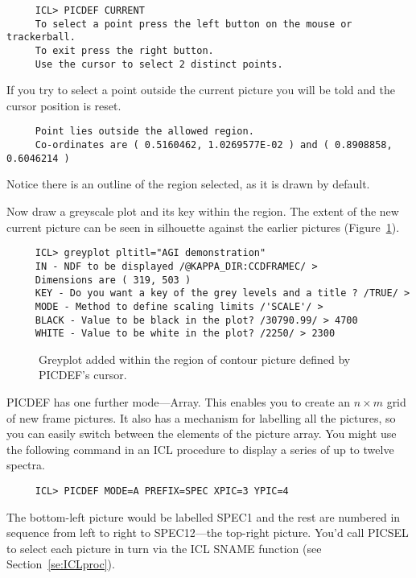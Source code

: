 {\small
\begin{verbatim}
     ICL> PICDEF CURRENT
     To select a point press the left button on the mouse or trackerball.
     To exit press the right button.
     Use the cursor to select 2 distinct points.
\end{verbatim}
\normalsize
If you try to select a point outside the current picture you will be told
and the cursor position is reset.

\small
\begin{verbatim}
     Point lies outside the allowed region.
     Co-ordinates are ( 0.5160462, 1.0269577E-02 ) and ( 0.8908858, 0.6046214 )
\end{verbatim}
\normalsize
Notice there is an outline of the region selected, as it is drawn
by default.

Now draw a greyscale plot and its key within the region.
The extent of the new current picture can be seen in silhouette against
the earlier pictures (Figure~\ref{fi:agi5}).

\small
\begin{verbatim}
     ICL> greyplot pltitl="AGI demonstration"
     IN - NDF to be displayed /@KAPPA_DIR:CCDFRAMEC/ >
     Dimensions are ( 319, 503 )
     KEY - Do you want a key of the grey levels and a title ? /TRUE/ >
     MODE - Method to define scaling limits /'SCALE'/ >
     BLACK - Value to be black in the plot? /30790.99/ > 4700
     WHITE - Value to be white in the plot? /2250/ > 2300
\end{verbatim}
\normalsize
\begin{figure}[ht]
\caption{Greyplot added within the region of contour picture defined by
PICDEF's cursor.}
\label{fi:agi5}
\vspace{4.4in}
\end{figure}
PICDEF has one further mode---Array.  This enables you to create an
$n\times m$ grid of new frame pictures.  It also has a mechanism for
labelling all the pictures, so you can easily switch between the
elements of the picture array.  You might use the following command in
an {\small ICL} procedure to display a series of up to twelve spectra.

\small
\begin{verbatim}
     ICL> PICDEF MODE=A PREFIX=SPEC XPIC=3 YPIC=4
\end{verbatim}
\normalsize
The bottom-left picture would be labelled SPEC1 and the rest are
numbered in sequence from left to right to SPEC12---the top-right
picture.  You'd call PICSEL to select each picture in turn via
the {\small ICL} SNAME function (see Section~\ref{se:ICLproc}).

}
